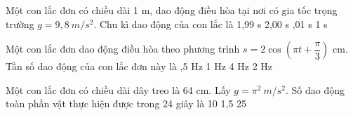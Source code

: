 \PhanI
\begin{ex}%
Một con lắc đơn có chiều dài 1 m, dao động điều hòa tại nơi có gia tốc trọng trường $g = 9,8\ m/s^2$. Chu kì dao động của con lắc là
\choice
{1,99 s}
{2,00 s}
{,01 s}
{1 s}
\end{ex} 
\begin{ex} %
Một con lắc đơn dao động điều hòa theo phương trình $s=2\cos \left({\pi t+\dfrac{\pi }{3}}\right)$ cm. Tần số dao động của con lắc đơn này là
\choice
{,5 Hz}
{1 Hz}
{4 Hz}
{2 Hz}

\end{ex} 
\begin{ex} %
Một con lắc đơn có chiều dài dây treo là 64 cm. Lấy $g=\pi ^2\ m/s^2$. Số dao động toàn phần vật thực hiện được trong 24 giây là
\choice
{}
{10}
{1,5}
{25}
\end{ex} 

